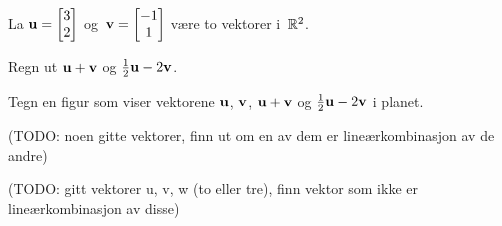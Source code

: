 
\begin{oppgave}
La $\mathbf{u} = \begin{bmatrix} 3 \\ 2 \end{bmatrix}$ og~$\mathbf{v} = \begin{bmatrix} -1 \\ 1 \end{bmatrix}$ være to vektorer
i~$\mathbb{R}^2$.

\begin{punkt}
Regn ut $\mathbf{u} + \mathbf{v}$ og $\frac{1}{2} \mathbf{u} - 2 \mathbf{v}$.
\end{punkt}

\begin{punkt}
Tegn en figur som viser vektorene $\mathbf{u}$, $\mathbf{v}$, $\mathbf{u} + \mathbf{v}$ og
$\frac{1}{2} \mathbf{u} - 2 \mathbf{v}$ i planet.
\end{punkt}
\end{oppgave}


\begin{oppgave}
(TODO: noen gitte vektorer, finn ut om en av dem er lineærkombinasjon av de andre)
\end{oppgave}


\begin{oppgave}
(TODO: gitt vektorer u, v, w (to eller tre), finn vektor som ikke er lineærkombinasjon av disse)
\end{oppgave}
